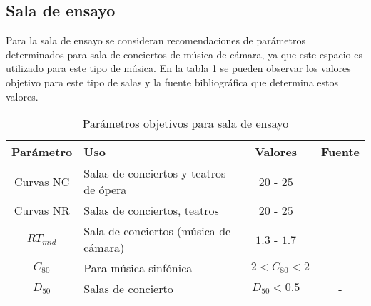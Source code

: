 \subsection{Sala de ensayo}
Para la sala de ensayo se consideran recomendaciones de parámetros determinados para sala de conciertos de música de cámara, ya que este espacio es utilizado para este tipo de música. En la tabla \ref{tab: parametros objetivos sala de ensayo} se pueden observar los valores objetivo para este tipo de salas y la fuente bibliográfica que determina estos valores.
\begin{table}[H]
    \centering
    \begin{tabular}{|c|l|c|c|}
    \hline
    \textbf{Parámetro} & \textbf{Uso}                  & \textbf{Valores}     & \textbf{Fuente}  \\ \hline
    Curvas NC & Salas de conciertos y teatros de ópera & $20$ - $25$ & \cite{Recuero} \\ \hline
    Curvas NR & Salas de conciertos, teatros & $20$ - $25$ & \cite{Recuero} \\ \hline
    $RT_{mid}$ & Sala de conciertos (música de cámara) & $1.3$ - $1.7$ & \cite{carrion1990diseno} \\ \hline
    $C_{80}$  & Para música sinfónica &  $-2<C_{80}<2$         &  \cite{marshall1994}  \\ \hline   
    $D_{50}$  & Salas de concierto         &  $D_{50}<0.5$         &  - \\ \hline
    \end{tabular}
    \caption{Parámetros objetivos para sala de ensayo}
    \label{tab: parametros objetivos sala de ensayo}
\end{table}